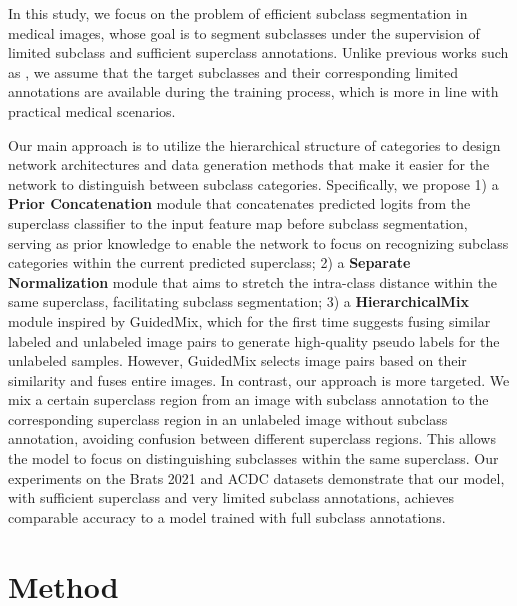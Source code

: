 \documentclass[runningheads]{llncs}
\begin{document}
\par In this study, we focus on the problem of efficient subclass segmentation in medical images, whose goal is to segment subclasses under the supervision of limited subclass and sufficient superclass annotations. Unlike previous works such as \cite{bukchin2021fine, fotakis2021efficient, yang2021towards, ni2021superclass}, we assume that the target subclasses and their corresponding limited annotations are available during the training process, which is more in line with practical medical scenarios.

\par Our main approach is to utilize the hierarchical structure of categories to design network architectures and data generation methods that make it easier for the network to distinguish between subclass categories. Specifically, we propose 1) a \textbf{Prior Concatenation} module that concatenates predicted logits from the superclass classifier to the input feature map before subclass segmentation, serving as prior knowledge to enable the network to focus on recognizing subclass categories within the current predicted superclass; 2) a \textbf{Separate Normalization} module that aims to stretch the intra-class distance within the same superclass, facilitating subclass segmentation; 3) a \textbf{HierarchicalMix} module inspired by GuidedMix\cite{Peng2022}, which for the first time suggests fusing similar labeled and unlabeled image pairs to generate high-quality pseudo labels for the unlabeled samples. However, GuidedMix selects image pairs based on their similarity and fuses entire images. In contrast, our approach is more targeted. We mix a certain superclass region from an image with subclass annotation to the corresponding superclass region in an unlabeled image without subclass annotation, avoiding confusion between different superclass regions. This allows the model to focus on distinguishing subclasses within the same superclass. Our experiments on the Brats 2021 \cite{baid2021rsna} and ACDC \cite{bernard2018deep} datasets demonstrate that our model, with sufficient superclass and very limited subclass annotations, achieves comparable accuracy to a model trained with full subclass annotations.


\section{Method}
\end{document}

